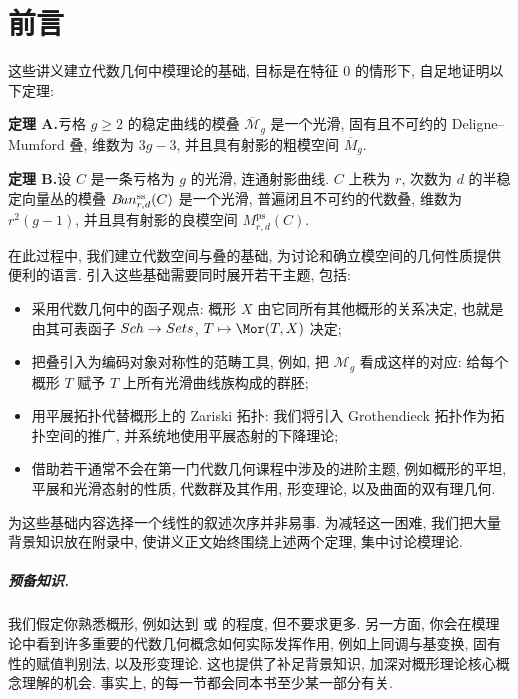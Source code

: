 \chapter*{前言}
\label{preface}
这些讲义建立代数几何中模理论的基础, 目标是在特征 $0$ 的情形下, 自足地证明以下定理: 

\noindent\textbf{定理 A.}\label{thm:A}\quad 亏格 $g\geq 2$ 的稳定曲线的模叠 $\overline{\mathcal M}_g$ 是一个光滑, 固有且不可约的 Deligne--Mumford 叠, 维数为 $3g-3$, 并且具有射影的粗模空间 $\overline M_g$.

\medskip
{}\noindent\textbf{定理 B.}\label{thm:B}\quad 设 $C$ 是一条亏格为 $g$ 的光滑, 连通射影曲线. $C$ 上秩为 $r$, 次数为 $d$ 的半稳定向量丛的模叠 $B\!un_{r,d}^{\mathrm{ss}}(C)$ 是一个光滑, 普遍闭且不可约的代数叠, 维数为 $r^2(g-1)$, 并且具有射影的良模空间 $M_{r,d}^{\mathrm{ps}}(C)$.

在此过程中, 我们建立代数空间与叠的基础, 为讨论和确立模空间的几何性质提供便利的语言. 引入这些基础需要同时展开若干主题, 包括: 
\begin{itemize}
\item 采用代数几何中的函子观点: 概形 $X$ 由它同所有其他概形的关系决定, 也就是由其可表函子 $Sch\to Sets$, $T\mapsto\Mor(T,X)$ 决定; 
\item 把叠引入为编码对象对称性的范畴工具, 例如, 把 $\mathcal M_g$ 看成这样的对应: 给每个概形 $T$ 赋予 $T$ 上所有光滑曲线族构成的群胚; 
\item 用平展拓扑代替概形上的 Zariski 拓扑: 我们将引入 Grothendieck 拓扑作为拓扑空间的推广, 并系统地使用平展态射的下降理论; 
\item 借助若干通常不会在第一门代数几何课程中涉及的进阶主题, 例如概形的平坦, 平展和光滑态射的性质, 代数群及其作用, 形变理论, 以及曲面的双有理几何.
\end{itemize}
为这些基础内容选择一个线性的叙述次序并非易事. 为减轻这一困难, 我们把大量背景知识放在附录中, 使讲义正文始终围绕上述两个定理, 集中讨论模理论.

\paragraph*{预备知识.} 我们假定你熟悉概形, 例如达到 \cite[第 $2$--$3$ 章]{Har77} 或 \cite[第 II--V 部分]{Vak17} 的程度, 但不要求更多. 另一方面, 你会在模理论中看到许多重要的代数几何概念如何实际发挥作用, 例如上同调与基变换, 固有性的赋值判别法, 以及形变理论. 这也提供了补足背景知识, 加深对概形理论核心概念理解的机会. 事实上, \cite{Har77,Vak17} 的每一节都会同本书至少某一部分有关.

